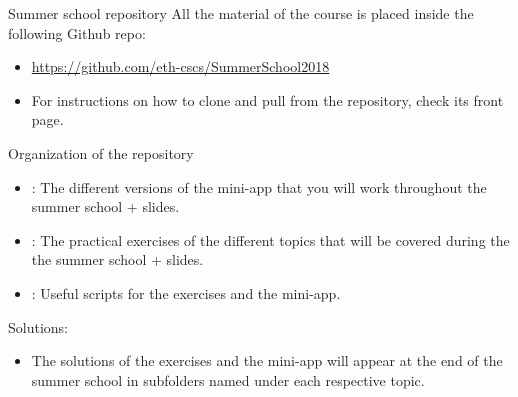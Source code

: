 \begin{frame}{Summer school repository}
  All the material of the course is placed inside the following Github repo:
  \begin{itemize}
  \item \url{https://github.com/eth-cscs/SummerSchool2018}
  \item For instructions on how to clone and pull from the repository, check
    its front page.
  \end{itemize}
  \vfill
  Organization of the repository
  \begin{itemize}
  \item {}: The different versions of the mini-app that you
    will work throughout the summer school + slides.
  \item {}: The practical exercises of the different topics
    that will be covered during the the summer school + slides.
  \item {}: Useful scripts for the exercises and the mini-app.
  \end{itemize}
  \vfill
  Solutions:
  \begin{itemize}
  \item The solutions of the exercises and the mini-app will appear at the end
    of the summer school in subfolders named  under each
    respective topic.
  \end{itemize}
\end{frame}
